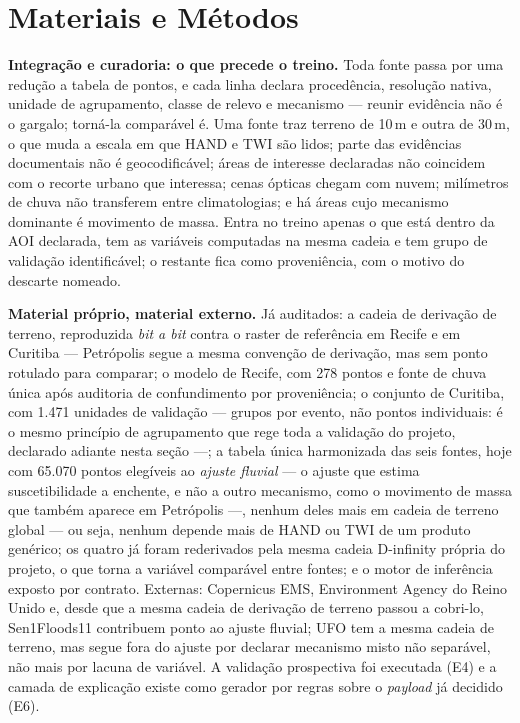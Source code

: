 \documentclass[conference]{IEEEtran}
\begin{document}
\section{Materiais e Métodos}

\textbf{Integração e curadoria: o que precede o treino.} Toda fonte passa por
uma redução a tabela de pontos, e cada linha declara procedência, resolução
nativa, unidade de agrupamento, classe de relevo e mecanismo --- reunir
evidência não é o gargalo; torná-la comparável é. Uma fonte traz terreno de
10\,m e outra de 30\,m, o que muda a escala em que HAND e TWI são lidos; parte
das evidências documentais não é geocodificável; áreas de interesse declaradas
não coincidem com o recorte urbano que interessa; cenas ópticas chegam com
nuvem; milímetros de chuva não transferem entre climatologias; e há áreas cujo
mecanismo dominante é movimento de massa. Entra no treino apenas o que está
dentro da AOI declarada, tem as variáveis computadas na mesma cadeia e tem
grupo de validação identificável; o restante fica como proveniência, com o
motivo do descarte nomeado.

\textbf{Material próprio, material externo.} Já auditados: a cadeia de derivação
de terreno, reproduzida \emph{bit a bit} contra o raster de referência em Recife
e em Curitiba --- Petrópolis segue a mesma convenção de derivação, mas sem ponto
rotulado para comparar; o modelo de Recife, com 278 pontos e fonte de chuva
única após auditoria de confundimento por proveniência; o conjunto de
Curitiba, com 1.471 unidades de validação --- grupos por evento, não pontos
individuais: é o mesmo princípio de agrupamento que rege toda a validação do
projeto, declarado adiante nesta seção ---; a tabela única harmonizada das
seis fontes, hoje com 65.070 pontos elegíveis ao \emph{ajuste fluvial} --- o
ajuste que estima suscetibilidade a enchente, e não a outro mecanismo, como o
movimento de massa que também aparece em Petrópolis ---, nenhum deles mais em
cadeia de terreno global --- ou seja, nenhum depende mais de HAND ou TWI de um
produto genérico; os quatro já foram rederivados pela mesma cadeia D-infinity
própria do projeto, o que torna a variável comparável entre fontes; e o motor
de inferência exposto por contrato. Externas:
Copernicus EMS, Environment Agency do Reino Unido e, desde que a mesma cadeia
de derivação de terreno passou a cobri-lo, Sen1Floods11 contribuem ponto ao
ajuste fluvial; UFO tem a mesma cadeia de terreno, mas segue fora do ajuste
por declarar mecanismo misto não separável, não mais por lacuna de variável.
A validação prospectiva foi executada (E4) e a camada de explicação existe como
gerador por regras sobre o \emph{payload} já decidido (E6).
\end{document}
